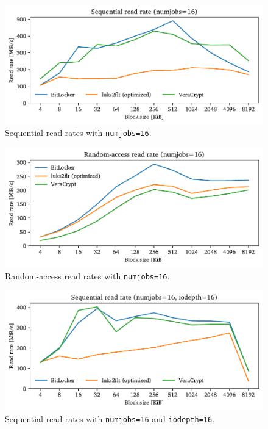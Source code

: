 \begin{figure}[htb!]
	\center
	\includegraphics[scale=1]{../fig/performance.hwexperiments.optseqthreads.pdf}
	\caption[
		Sequential read rates with \texttt{numjobs=16}
	]{
		Sequential read rates with \texttt{numjobs=16}. 
	}
	\label{fig:performance.hwexperiments.optseqthreads}
\end{figure}

\begin{figure}[htb!]
	\center
	\includegraphics[scale=1]{../fig/performance.hwexperiments.optrandthreads.pdf}
	\caption[
		Random-access read rates with \texttt{numjobs=16}
	]{
		Random-access read rates with \texttt{numjobs=16}. 
	}
	\label{fig:performance.hwexperiments.optrandthreads}
\end{figure}

\begin{figure}[htb!]
	\center
	\includegraphics[scale=1]{../fig/performance.hwexperiments.optseqthreadsqueue.pdf}
	\caption[
		Sequential read rates with \texttt{numjobs=16} and \texttt{iodepth=16}
	]{
		Sequential read rates with \texttt{numjobs=16} and \texttt{iodepth=16}. 
	}
	\label{fig:performance.hwexperiments.optseqthreadsqueue}
\end{figure}

